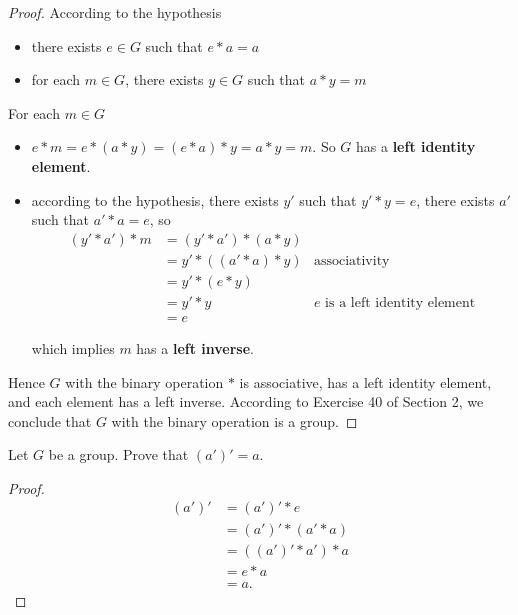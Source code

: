 \begin{proof}
    According to the hypothesis
    \begin{itemize}
        \item there exists $e\in G$ such that $e * a = a$
        \item for each $m\in G$, there exists $y\in G$ such that $a * y = m$
    \end{itemize}

    For each $m\in G$
    \begin{itemize}
        \item $e * m = e * (a * y) = (e * a) * y = a * y = m$. So $G$ has a \textbf{left identity element}.
        \item according to the hypothesis, there exists $y'$ such that $y' * y = e$, there exists $a'$ such that $a' * a = e$, so
              \begin{align*}
                  (y' * a') * m & = (y' * a') * (a * y)                                         \\
                                & = y' * ((a' * a) * y) & \text{associativity}                  \\
                                & = y' * (e * y)                                                \\
                                & = y' * y              & \text{$e$ is a left identity element} \\
                                & = e
              \end{align*}

              which implies $m$ has a \textbf{left inverse}.
    \end{itemize}

    Hence $G$ with the binary operation $*$ is associative, has a left identity element, and each element has a left inverse. According to Exercise 40 of Section 2, we conclude that $G$ with the binary operation is a group.
\end{proof}

\begin{exercise}
    Let $G$ be a group. Prove that $(a')' = a$.
\end{exercise}

\begin{proof}
    \begin{align*}
        (a')' & = (a')' * e        \\
              & = (a')' * (a' * a) \\
              & = ((a')' * a') * a \\
              & = e * a            \\
              & = a.
    \end{align*}
\end{proof}


